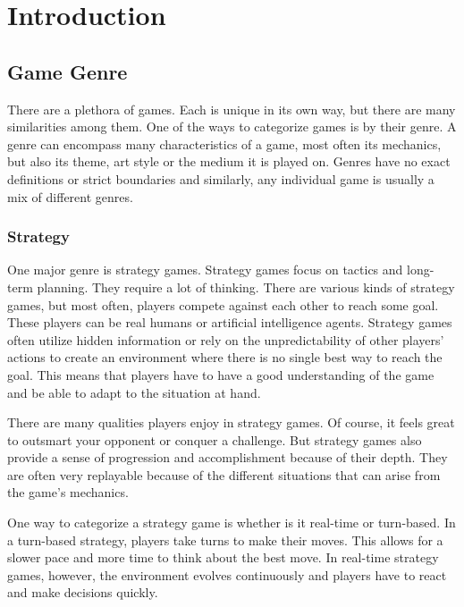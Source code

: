 \chapter{Introduction}


\section{Game Genre}

There are a plethora of games.
Each is unique in its own way, but there are many similarities among them.
One of the ways to categorize games is by their genre.
A genre can encompass many characteristics of a game, most often its mechanics, but also its theme, art style or the medium it is played on.
Genres have no exact definitions or strict boundaries and similarly, any individual game is usually a mix of different genres.

\subsection{Strategy}

One major genre is strategy games.
Strategy games focus on tactics and long-term planning.
They require a lot of thinking.
There are various kinds of strategy games, but most often, players compete against each other to reach some goal.
These players can be real humans or artificial intelligence agents.
Strategy games often utilize hidden information or rely on the unpredictability of other players' actions to create an environment where there is no single best way to reach the goal.
This means that players have to have a good understanding of the game and be able to adapt to the situation at hand.

There are many qualities players enjoy in strategy games.
Of course, it feels great to outsmart your opponent or conquer a challenge.
But strategy games also provide a sense of progression and accomplishment because of their depth.
They are often very replayable because of the different situations that can arise from the game's mechanics.

One way to categorize a strategy game is whether is it real-time or turn-based.
In a turn-based strategy, players take turns to make their moves.
This allows for a slower pace and more time to think about the best move.
In real-time strategy games, however, the environment evolves continuously and players have to react and make decisions quickly.

